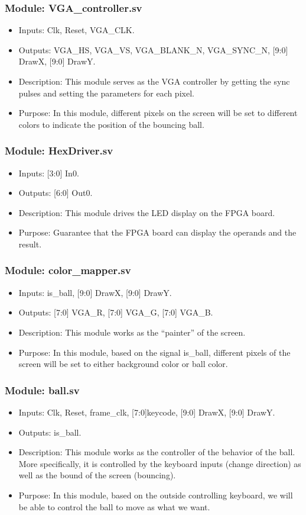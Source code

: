 \documentclass[11pt]{article}
\begin{document}
\subsubsection{Module: VGA\_controller.sv}
\begin{itemize}
\item Inputs: Clk, Reset, VGA\_CLK.
\item Outputs: VGA\_HS, VGA\_VS, VGA\_BLANK\_N, VGA\_SYNC\_N, [9:0] DrawX, [9:0] DrawY.
\item Description: This module serves as the VGA controller by getting the sync pulses and setting the parameters for each pixel.
\item Purpose: In this module, different pixels on the screen will be set to different colors to indicate the position of the bouncing ball.
\end{itemize}
\subsubsection{Module: HexDriver.sv}
\begin{itemize}
\item Inputs: [3:0] In0.
\item Outputs: [6:0] Out0.
\item Description: This module drives the LED display on the FPGA board.
\item Purpose: Guarantee that the FPGA board can display the operands and the result.
\end{itemize}
\subsubsection{Module: color\_mapper.sv}
\begin{itemize}
\item Inputs: is\_ball, [9:0] DrawX, [9:0] DrawY.
\item Outputs: [7:0] VGA\_R, [7:0] VGA\_G, [7:0] VGA\_B.
\item Description: This module works as the “painter” of the screen.
\item Purpose: In this module, based on the signal is\_ball, different pixels of the screen will be set to either background color or ball color.
\end{itemize}
\subsubsection{Module: ball.sv}
\begin{itemize}
\item Inputs: Clk, Reset, frame\_clk, [7:0]keycode, [9:0] DrawX, [9:0] DrawY.
\item Outputs: is\_ball.
\item Description: This module works as the controller of the behavior of the ball. More specifically, it is controlled by the keyboard inputs (change direction) as well as the bound of the screen (bouncing).
\item Purpose: In this module, based on the outside controlling keyboard, we will be able to control the ball to move as what we want.
\end{itemize}
\end{document}
